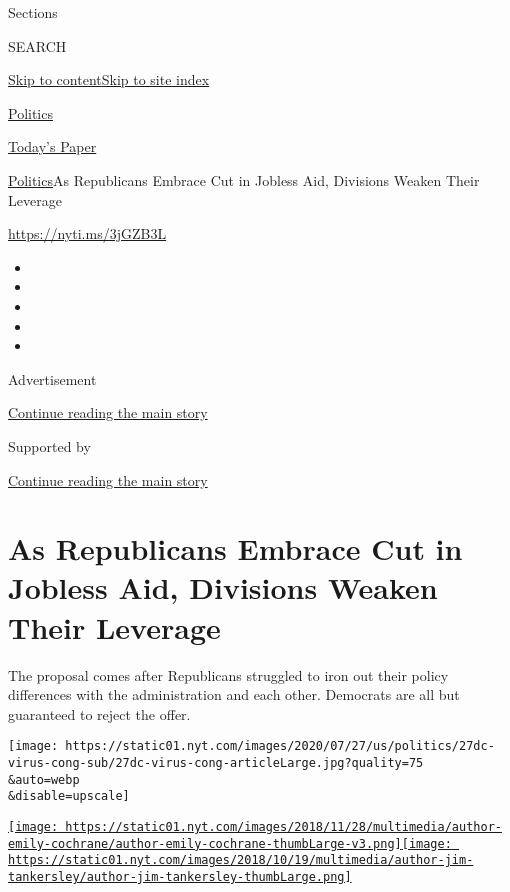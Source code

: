 Sections

SEARCH

\protect\hyperlink{site-content}{Skip to
content}\protect\hyperlink{site-index}{Skip to site index}

\href{https://www.nytimes.com/section/politics}{Politics}

\href{https://myaccount.nytimes.com/auth/login?response_type=cookie\&client_id=vi}{}

\href{https://www.nytimes.com/section/todayspaper}{Today's Paper}

\href{/section/politics}{Politics}\textbar{}As Republicans Embrace Cut
in Jobless Aid, Divisions Weaken Their Leverage

\url{https://nyti.ms/3jGZB3L}

\begin{itemize}
\item
\item
\item
\item
\item
\end{itemize}

Advertisement

\protect\hyperlink{after-top}{Continue reading the main story}

Supported by

\protect\hyperlink{after-sponsor}{Continue reading the main story}

\hypertarget{as-republicans-embrace-cut-in-jobless-aid-divisions-weaken-their-leverage}{%
\section{As Republicans Embrace Cut in Jobless Aid, Divisions Weaken
Their
Leverage}\label{as-republicans-embrace-cut-in-jobless-aid-divisions-weaken-their-leverage}}

The proposal comes after Republicans struggled to iron out their policy
differences with the administration and each other. Democrats are all
but guaranteed to reject the offer.

\texttt{[image: https://static01.nyt.com/images/2020/07/27/us/politics/27dc-virus-cong-sub/27dc-virus-cong-articleLarge.jpg?quality=75\\\&auto=webp\\\&disable=upscale]}

\href{https://www.nytimes.com/by/emily-cochrane}{\texttt{[image: https://static01.nyt.com/images/2018/11/28/multimedia/author-emily-cochrane/author-emily-cochrane-thumbLarge-v3.png]}}\href{https://www.nytimes.com/by/jim-tankersley}{\texttt{[image: https://static01.nyt.com/images/2018/10/19/multimedia/author-jim-tankersley/author-jim-tankersley-thumbLarge.png]}}

